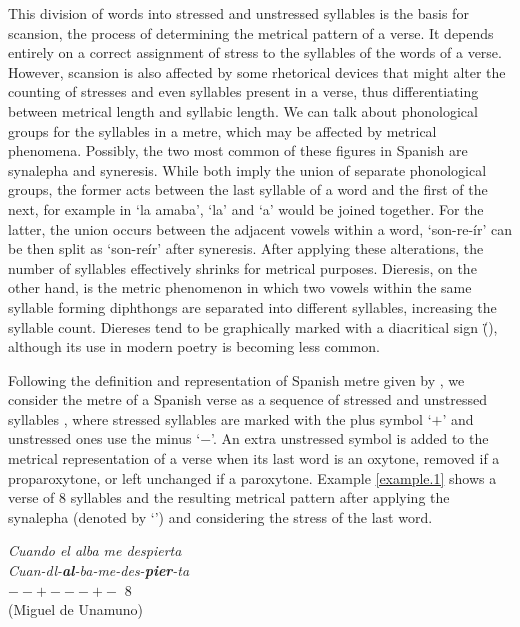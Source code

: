 \documentclass[a4paper,11pt,twocolumn,twoside]{article}
\begin{document}
This division of words into stressed and unstressed syllables is the basis for scansion, the process of determining the metrical pattern of a verse. It depends entirely on a correct assignment of stress to the syllables of the words of a verse. However, scansion is also affected by some rhetorical devices that might alter the counting of stresses and even syllables present in a verse, thus differentiating between metrical length and syllabic length. We can talk about phonological groups for the syllables in a metre, which may be affected by metrical phenomena. Possibly, the two most common of these figures in Spanish are synalepha and syneresis. While both imply the union of separate phonological groups, the former acts between the last syllable of a word and the first of the next, for example in `la amaba', `la' and `a' would be joined together. For the latter, the union occurs between the adjacent vowels within a word, `son-re-ír' can be then split as `son-reír' after syneresis. After applying these alterations, the number of syllables effectively shrinks for metrical purposes. Dieresis, on the other hand, is the metric phenomenon in which two vowels within the same syllable forming diphthongs are separated into different syllables, increasing the syllable count. Diereses tend to be graphically marked with a diacritical sign (\"{ }), although its use in modern poetry is becoming less common.  %

Following the definition and representation of Spanish metre given by , we consider the metre of a Spanish verse as a sequence of stressed and unstressed syllables \cite{quilis1969metrica,navarro1991metrica,caparros1993metrica}, where stressed syllables are marked with the plus symbol `$+$' and unstressed ones use the minus `$-$'. An extra unstressed symbol is added to the metrical representation of a verse when its last word is an oxytone, removed if a proparoxytone, or left unchanged if a paroxytone. Example \ref{example.1} shows a verse of 8 syllables and the resulting metrical pattern after applying the synalepha (denoted by `\textbottomtiebar{ }') and considering the stress of the last word.

\begin{subexamples}\label{example.1}
\textit{Cuando el alba me despierta} \\
\textit{Cuan-dl-\textbf{al}-ba-me-des-\textbf{pier}-ta} \\
$--+---+-$ 8 \\
(Miguel de Unamuno)
\end{subexamples}
\end{document}
